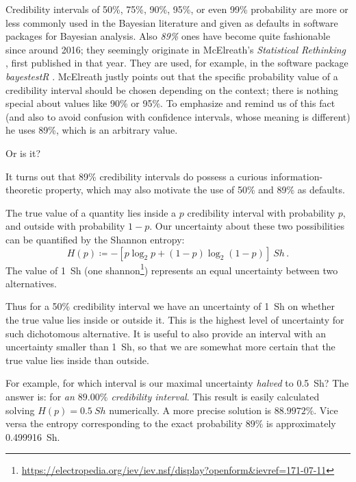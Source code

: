 \documentclass[a4paper,12pt,%
onecolumn,oneside,article,%
british%
]{memoir}
\newcommand*{\defd}{\coloneqq}
\renewcommand*{\|}[1][]{\nonscript\:#1\vert\nonscript\:\mathopen{}}
\newcommand*{\sect}{\S}%
\newcommand*{\eg}{{e.g.}}
\begin{document}
Credibility intervals of 50\%, 75\%, 90\%, 95\%, or even 99\% probability are more or less commonly used in the Bayesian literature and given as defaults in software packages for Bayesian analysis. Also \emph{89\%} ones have become quite fashionable since around 2016; they seemingly originate in McElreath's \emph{Statistical Rethinking} \autocites{mcelreath2016_r2020}, first published in that year. They are used, for example, in the software package \emph{bayestestR} \autocites{makowskietal2019}. McElreath justly points out\autocites[\eg\ \sect~3.2.2 p.~56, \sect~4.3.5 p.~88]{mcelreath2016_r2020} that the specific probability value of a credibility interval should be chosen depending on the context; there is nothing special about values like 90\% or 95\%. To emphasize and remind us of this fact (and also to avoid confusion with confidence intervals, whose meaning is different) he uses 89\%, which is an arbitrary value.

Or is it?

It turns out that 89\% credibility intervals do possess a curious information-theoretic property, which may also motivate the use of 50\% and 89\% as defaults.

The true value of a quantity lies inside a $p$ credibility interval with probability $p$, and outside with probability $1-p$. Our uncertainty about these two possibilities can be quantified by the Shannon entropy: \autocites[Items 13-24, 13-25]{iso2008d}
\begin{equation}
  \label{eq:shannon_def}
  H(p) \defd -[ p \log_{2} p + (1-p) \log_{2}(1-p) ]\:\unit{Sh} \,.
\end{equation}
The value of \qty{1}{Sh} (one shannon\footnote{\url{https://electropedia.org/iev/iev.nsf/display?openform&ievref=171-07-11}}) represents an equal uncertainty between two alternatives.

Thus for a 50\% credibility interval we have an uncertainty of \qty{1}{Sh} on whether the true value lies inside or outside it. This is the highest level of uncertainty for such dichotomous alternative. It is useful to also provide an interval with an uncertainty smaller than \qty{1}{Sh}, so that we are somewhat more certain that the true value lies inside than outside.

For example, for which interval is our maximal uncertainty \emph{halved} to \qty{0.5}{Sh}? The answer is: for \emph{an $89.00\%$ credibility interval}. This result is easily calculated solving $H(p) = \qty{0.5}{Sh}$ numerically. A more precise solution is $88.9972\%$. Vice versa the entropy corresponding to the exact probability $89\%$ is approximately \qty{0.499916}{Sh}.
\end{document}

